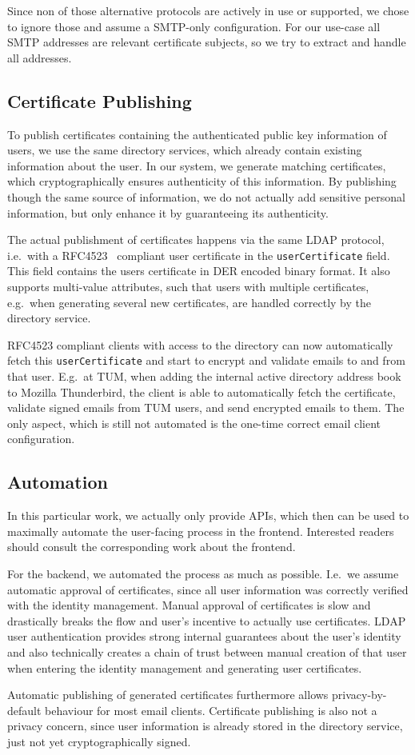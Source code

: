 Since non of those alternative protocols are actively in use or supported, we chose to ignore those and assume a
SMTP-only configuration.
For our use-case all SMTP addresses are relevant certificate subjects, so we try to extract and handle all addresses.

\subsection*{Certificate Publishing}
To publish certificates containing the authenticated public key information of users, we use the same directory
services, which already contain existing information about the user.
In our system, we generate matching certificates, which cryptographically ensures authenticity of this information.
By publishing though the same source of information, we do not actually add sensitive personal information, but only
enhance it by guaranteeing its authenticity.

The actual publishment of certificates happens via the same LDAP protocol, i.e.\ with a RFC4523~\cite{RFC4523} compliant
user certificate in the \lstinline{userCertificate} field.
This field contains the users certificate in DER encoded binary format.
It also supports multi-value attributes, such that users with multiple certificates, e.g.\ when generating several new
certificates, are handled correctly by the directory service.

RFC4523 compliant clients with access to the directory can now automatically fetch this \lstinline{userCertificate} and
start to encrypt and validate emails to and from that user.
E.g.\ at TUM, when adding the internal active directory address book to Mozilla Thunderbird, the client is able to
automatically fetch the certificate, validate signed emails from TUM users, and send encrypted emails to them.
The only aspect, which is still not automated is the one-time correct email client configuration.

\subsection*{Automation}
In this particular work, we actually only provide APIs, which then can be used to maximally automate the user-facing
process in the frontend.
Interested readers should consult the corresponding work about the frontend.

For the backend, we automated the process as much as possible.
I.e.\ we assume automatic approval of certificates, since all user information was correctly verified with the identity
management.
Manual approval of certificates is slow and drastically breaks the flow and user's incentive to actually use
certificates.
LDAP user authentication provides strong internal guarantees about the user's identity and also technically creates a
chain of trust between manual creation of that user when entering the identity management and generating user
certificates.

Automatic publishing of generated certificates furthermore allows privacy-by-default behaviour for most email clients.
Certificate publishing is also not a privacy concern, since user information is already stored in the directory service,
just not yet cryptographically signed.
